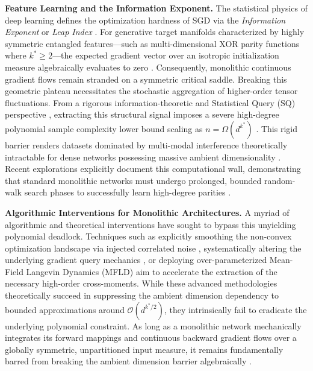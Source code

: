 \documentclass{article}
\newcommand{\1}{\mathbb{I}}
\newcommand{\calO}{\mathcal{O}}
\begin{document}
\textbf{Feature Learning and the Information Exponent.} The statistical physics of deep learning defines the optimization hardness of SGD via the \textit{Information Exponent} or \textit{Leap Index} \citep{benarous2021online, abbe2022merged, dandi2024reusing}. For generative target manifolds characterized by highly symmetric entangled features---such as multi-dimensional XOR parity functions where $k^* \ge 2$---the expected gradient vector over an isotropic initialization measure algebraically evaluates to zero \citep{damian2022neural, bietti2022sample}. Consequently, monolithic continuous gradient flows remain stranded on a symmetric critical saddle. Breaking this geometric plateau necessitates the stochastic aggregation of higher-order tensor fluctuations. From a rigorous information-theoretic and Statistical Query (SQ) perspective \citep{kearns1998efficient}, extracting this structural signal imposes a severe high-degree polynomial sample complexity lower bound scaling as $n = \Omega(d^{k^*})$ \citep{abbe2023sgd, benarous2021online}. This rigid barrier renders datasets dominated by multi-modal interference theoretically intractable for dense networks possessing massive ambient dimensionality \citep{joshi2024complexity}. Recent explorations explicitly document this computational wall, demonstrating that standard monolithic networks must undergo prolonged, bounded random-walk search phases to successfully learn high-degree parities \citep{barak2022hidden, daniely2020learning}. 

\textbf{Algorithmic Interventions for Monolithic Architectures.} A myriad of algorithmic and theoretical interventions have sought to bypass this unyielding polynomial deadlock. Techniques such as explicitly smoothing the non-convex optimization landscape via injected correlated noise \citep{damian2023smoothing}, systematically altering the underlying gradient query mechanics \citep{joshi2024complexity}, or deploying over-parameterized Mean-Field Langevin Dynamics (MFLD) \citep{mei2018mean, chizat2018global, sirignano2020mean} aim to accelerate the extraction of the necessary high-order cross-moments. While these advanced methodologies theoretically succeed in suppressing the ambient dimension dependency to bounded approximations around $\calO(d^{k^*/2})$, they intrinsically fail to eradicate the underlying polynomial constraint. As long as a monolithic network mechanically integrates its forward mappings and continuous backward gradient flows over a globally symmetric, unpartitioned input measure, it remains fundamentally barred from breaking the ambient dimension barrier algebraically \citep{dandi2024how}.
\end{document}
